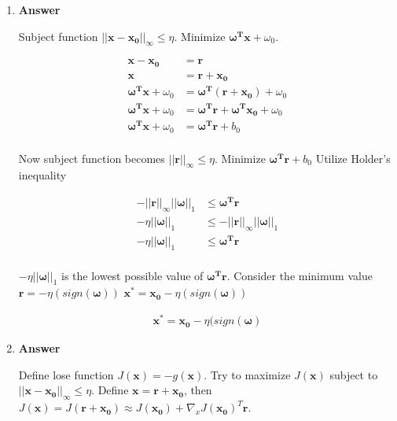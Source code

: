 \documentclass[11pt]{article}
\begin{document}
\begin{enumerate}[label=(\alph*)]
\begin{enumerate}[label=(\roman*)]

\item \noindent\textbf{Answer}

Subject function $||\mathbf{x}-\mathbf{x_0}||_\infty \leq \eta$. Minimize $ \boldsymbol{\omega^T}\mathbf{x} + \omega_0 $.

\begin{align*}
\mathbf{x}-\mathbf{x_0} &= \mathbf{r} \\
\mathbf{x} &= \mathbf{r} + \mathbf{x_0}\\
\boldsymbol{\omega^T}\mathbf{x} + \omega_0 &= \boldsymbol{\omega^T}( \mathbf{r} + \mathbf{x_0}) + \omega_0\\
\boldsymbol{\omega^T}\mathbf{x} + \omega_0 &= \boldsymbol{\omega^T}\mathbf{r} + \boldsymbol{\omega^T}\mathbf{x_0} + \omega_0\\
\boldsymbol{\omega^T}\mathbf{x} + \omega_0 &= \boldsymbol{\omega^T}\mathbf{r} + b_0\\
\end{align*}

Now subject function becomes $||\mathbf{r}||_\infty \leq \eta $. Minimize $ \boldsymbol{\omega^T}\mathbf{r} + b_0$ Utilize Holder’s inequality

\begin{align*}
- ||\mathbf{r}||_\infty ||\boldsymbol{\omega}||_1  & \leq  \boldsymbol{\omega^T}\mathbf{r} \\
 -\eta  ||\boldsymbol{\omega}||_1& \leq - ||\mathbf{r}||_\infty ||\boldsymbol{\omega}||_1 \\
 -\eta  ||\boldsymbol{\omega}||_1&  \leq  \boldsymbol{\omega^T}\mathbf{r} \\
\end{align*}

$-\eta  ||\boldsymbol{\omega}||_1$ is the lowest possible value of $\boldsymbol{\omega^T}\mathbf{r}$. Consider the minimum value $\mathbf{r} = -\eta (sign(\boldsymbol{\omega}))$ $\mathbf{x^*} = \mathbf{x_0} - \eta (sign(\boldsymbol{\omega}))$

\begin{align*}
\mathbf{x^*} = \mathbf{x_0} - \eta (sign(\boldsymbol{\omega})
\end{align*}

\item \noindent\textbf{Answer}

Define lose function $J(\mathbf{x}) = -g(\mathbf{x})$. Try to maximize $J(\mathbf{x})$ subject to $||\mathbf{x}-\mathbf{x_0}||_\infty \leq \eta$. Define $\mathbf{x} = \mathbf{r} + \mathbf{x_0}$, then $J(\mathbf{x}) = J(\mathbf{r} + \mathbf{x_0}) \approx J(  \mathbf{x_0}) + \nabla_x J(  \mathbf{x_0})^T \mathbf{r}$. 


\end{enumerate}
\end{enumerate}
\end{document}
